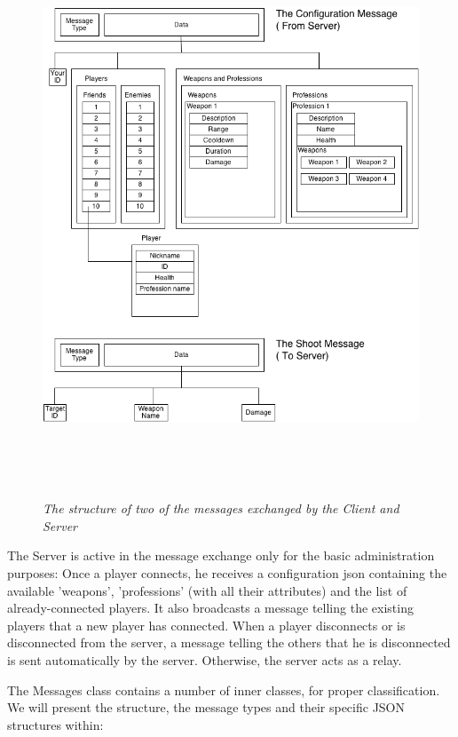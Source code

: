 \begin{figure}
\includegraphics[height=6.6in,width=6in]{./images/diagrams/message_structures.png}
\caption{\small \sl The structure of two of the messages exchanged by the Client
and Server
\label{fig:message_structures}}
\end{figure}

The Server is active in the message exchange only for the basic administration
purposes: Once a player connects, he receives a configuration json containing
the available 'weapons', 'professions' (with all their attributes) and the list
of already-connected players. It also broadcasts a message telling the existing
players that a new player has connected. When a player disconnects or is
disconnected from the server, a message telling the others that he is
disconnected is sent automatically by the server. Otherwise, the server acts as
a relay.\newline

The Messages class contains a number of inner classes, for proper
classification. We will present the structure, the message types and their
specific JSON structures within:

